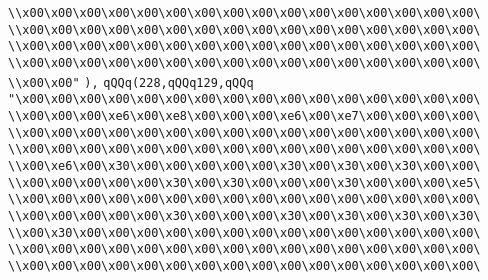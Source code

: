 \verb|\\x00\x00\x00\x00\x00\x00\x00\x00\x00\x00\x00\x00\x00\x00\x00\x00\|\newline
\verb|\\x00\x00\x00\x00\x00\x00\x00\x00\x00\x00\x00\x00\x00\x00\x00\x00\|\newline
\verb|\\x00\x00\x00\x00\x00\x00\x00\x00\x00\x00\x00\x00\x00\x00\x00\x00\|\newline
\verb|\\x00\x00\x00\x00\x00\x00\x00\x00\x00\x00\x00\x00\x00\x00\x00\x00\|\newline
\verb|\\x00\x00"|\newline
\verb|),|\newline
\verb|qQQq(228,qQQq129,qQQq|\newline
\verb|"\x00\x00\x00\x00\x00\x00\x00\x00\x00\x00\x00\x00\x00\x00\x00\x00\|\newline
\verb|\\x00\x00\x00\xe6\x00\xe8\x00\x00\x00\xe6\x00\xe7\x00\x00\x00\x00\|\newline
\verb|\\x00\x00\x00\x00\x00\x00\x00\x00\x00\x00\x00\x00\x00\x00\x00\x00\|\newline
\verb|\\x00\x00\x00\x00\x00\x00\x00\x00\x00\x00\x00\x00\x00\x00\x00\x00\|\newline
\verb|\\x00\xe6\x00\x30\x00\x00\x00\x00\x00\x30\x00\x30\x00\x30\x00\x00\|\newline
\verb|\\x00\x00\x00\x00\x00\x30\x00\x30\x00\x00\x00\x30\x00\x00\x00\xe5\|\newline
\verb|\\x00\x00\x00\x00\x00\x00\x00\x00\x00\x00\x00\x00\x00\x00\x00\x00\|\newline
\verb|\\x00\x00\x00\x00\x00\x30\x00\x00\x00\x30\x00\x30\x00\x30\x00\x30\|\newline
\verb|\\x00\x30\x00\x00\x00\x00\x00\x00\x00\x00\x00\x00\x00\x00\x00\x00\|\newline
\verb|\\x00\x00\x00\x00\x00\x00\x00\x00\x00\x00\x00\x00\x00\x00\x00\x00\|\newline
\verb|\\x00\x00\x00\x00\x00\x00\x00\x00\x00\x00\x00\x00\x00\x00\x00\x00\|\newline
